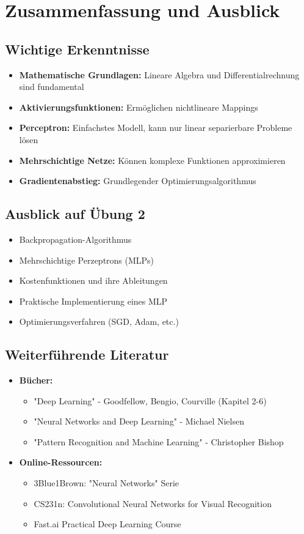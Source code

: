 \documentclass[12pt,a4paper]{article}
\begin{document}
\section{Zusammenfassung und Ausblick}

\subsection{Wichtige Erkenntnisse}
\begin{itemize}
    \item \textbf{Mathematische Grundlagen:} Lineare Algebra und Differentialrechnung sind fundamental
    \item \textbf{Aktivierungsfunktionen:} Ermöglichen nichtlineare Mappings
    \item \textbf{Perceptron:} Einfachstes Modell, kann nur linear separierbare Probleme lösen
    \item \textbf{Mehrschichtige Netze:} Können komplexe Funktionen approximieren
    \item \textbf{Gradientenabstieg:} Grundlegender Optimierungsalgorithmus
\end{itemize}

\subsection{Ausblick auf Übung 2}
\begin{itemize}
    \item Backpropagation-Algorithmus
    \item Mehrschichtige Perzeptrons (MLPs)
    \item Kostenfunktionen und ihre Ableitungen
    \item Praktische Implementierung eines MLP
    \item Optimierungsverfahren (SGD, Adam, etc.)
\end{itemize}

\subsection{Weiterführende Literatur}
\begin{itemize}
    \item \textbf{Bücher:}
    \begin{itemize}
        \item "Deep Learning" - Goodfellow, Bengio, Courville (Kapitel 2-6)
        \item "Neural Networks and Deep Learning" - Michael Nielsen
        \item "Pattern Recognition and Machine Learning" - Christopher Bishop
    \end{itemize}
    \item \textbf{Online-Ressourcen:}
    \begin{itemize}
        \item 3Blue1Brown: "Neural Networks" Serie
        \item CS231n: Convolutional Neural Networks for Visual Recognition
        \item Fast.ai Practical Deep Learning Course
    \end{itemize}
\end{itemize}
\end{document}
